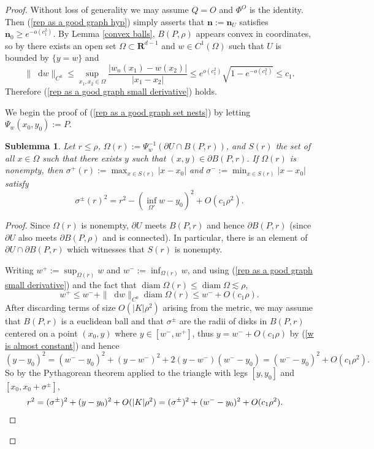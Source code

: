 \documentclass[final,12pt, leqno]{brownthesis}
\newcommand{\RR}{\mathbf{R}}
\DeclareMathOperator{\diam}{diam}
\newcommand*\dif{\mathop{}\!\mathrm{d}}
\newcommand{\normal}{\mathbf n}
\newtheorem{sublemma}[theorem]{Sublemma}
\theoremstyle{definition}
\numberwithin{equation}{section}
\begin{document}
\begin{proof}
Without loss of generality we may assume $Q = O$ and $\Phi^O$ is the identity. Then (\ref{rep as a good graph hyp}) simply asserts that $\normal := \normal_U$ satisfies $\normal_0 \geq e^{-o(c_1^2)}$.
By Lemma \ref{convex balls}, $B(P, \rho)$ appears convex in coordinates, so by \cite[Theorem 4.8]{Giusti77} there exists an open set $\Omega \subset \RR^{d - 1}$ and $w \in C^1(\Omega)$ such that $U$ is bounded by $\{y = w\}$ and
$$\|\dif w\|_{C^0} \leq \sup_{x_1, x_2 \in \Omega} \frac{|w_n(x_1) - w(x_2)|}{|x_1 - x_2|} \leq e^{o(c_1^2)}\sqrt{1 - e^{-o(c_1^2)}} \leq c_1.$$
Therefore (\ref{rep as a good graph small derivative}) holds.

We begin the proof of (\ref{rep as a good graph set nests}) by letting $\Psi_w(x_0, y_0) := P$.

\begin{sublemma}
Let $r \leq \rho$, $\Omega(r) := \Psi_w^{-1}(\partial U \cap B(P, r))$, and $S(r)$ the set of all $x \in \Omega$ such that there exists $y$ such that $(x, y) \in \partial B(P, r)$.
If $\Omega(r)$ is nonempty, then $\sigma^+(r) := \max_{x \in S(r)} |x - x_0|$ and $\sigma^- := \min_{x \in S(r)} |x - x_0|$ satisfy
$$\sigma^\pm(r)^2 = r^2 - (\inf_{\Omega'} w - y_0)^2 + O(c_1 \rho^2).$$
\end{sublemma}
\begin{proof}
Since $\Omega(r)$ is nonempty, $\partial U$ meets $B(P, r)$ and hence $\partial B(P, r)$ (since $\partial U$ also meets $\partial B(P, \rho)$ and is connected).
In particular, there is an element of $\partial U \cap \partial B(P, r)$ which witnesses that $S(r)$ is nonempty.

Writing $w^+ := \sup_{\Omega(r)} w$ and $w^- := \inf_{\Omega(r)} w$, and using (\ref{rep as a good graph small derivative}) and the fact that $\diam \Omega(r) \leq \diam \Omega \lesssim \rho$,
\begin{equation}\label{w is almost constant}
w^+ \leq w^- + \|\dif w\|_{C^0} \diam \Omega(r) \leq w^- + O(c_1 \rho).
\end{equation}
After discarding terms of size $O(|K| \rho^2)$ arising from the metric, we may assume that $B(P, r)$ is a euclidean ball and that $\sigma^\pm$ are the radii of disks in $B(P, r)$ centered on a point $(x_0, y)$ where $y \in [w^-, w^+]$, thus $y = w^- + O(c_1 \rho)$ by (\ref{w is almost constant}) and hence
$$(y - y_0)^2 = (w^- - y_0)^2 + (y - w^-)^2 + 2(y - w^-)(w^- - y_0) = (w^- - y_0)^2 + O(c_1 \rho^2).$$
So by the Pythagorean theorem applied to the triangle with legs $[y, y_0]$ and $[x_0, x_0 + \sigma^\pm]$,
\begin{align*}
r^2 &= (\sigma^\pm)^2 + (y - y_0)^2 + O(|K| \rho^2) = (\sigma^\pm)^2 + (w^- - y_0)^2 + O(c_1 \rho^2). \qedhere
\end{align*}
\end{proof}


\end{proof}
\end{document}
